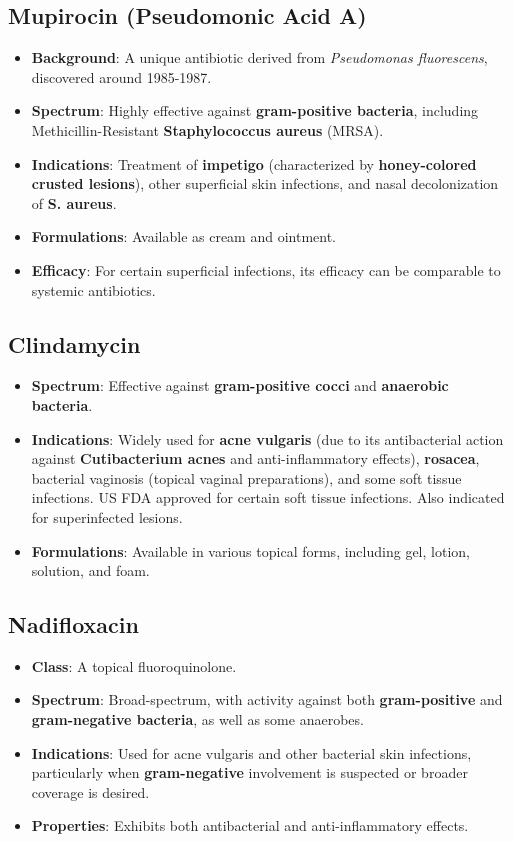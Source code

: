 \documentclass{article}
\begin{document}
\subsection*{\textbf{Mupirocin} (Pseudomonic Acid A)}
\begin{itemize}
    \item \textbf{Background}: A unique antibiotic derived from \textit{Pseudomonas fluorescens}, discovered around 1985-1987.
    \item \textbf{Spectrum}: Highly effective against \textbf{gram-positive bacteria}, including Methicillin-Resistant \textbf{Staphylococcus aureus} (MRSA).
    \item \textbf{Indications}: Treatment of \textbf{impetigo} (characterized by \textbf{honey-colored crusted lesions}), other superficial skin infections, and nasal decolonization of \textbf{S. aureus}.
    \item \textbf{Formulations}: Available as cream and ointment.
    \item \textbf{Efficacy}: For certain superficial infections, its efficacy can be comparable to systemic antibiotics.
\end{itemize}

\subsection*{\textbf{Clindamycin}}
\begin{itemize}
    \item \textbf{Spectrum}: Effective against \textbf{gram-positive cocci} and \textbf{anaerobic bacteria}.
    \item \textbf{Indications}: Widely used for \textbf{acne vulgaris} (due to its antibacterial action against \textbf{Cutibacterium acnes} and anti-inflammatory effects), \textbf{rosacea}, bacterial vaginosis (topical vaginal preparations), and some soft tissue infections. US FDA approved for certain soft tissue infections. Also indicated for superinfected lesions.
    \item \textbf{Formulations}: Available in various topical forms, including gel, lotion, solution, and foam.
\end{itemize}

\subsection*{\textbf{Nadifloxacin}}
\begin{itemize}
    \item \textbf{Class}: A topical fluoroquinolone.
    \item \textbf{Spectrum}: Broad-spectrum, with activity against both \textbf{gram-positive} and \textbf{gram-negative bacteria}, as well as some anaerobes.
    \item \textbf{Indications}: Used for acne vulgaris and other bacterial skin infections, particularly when \textbf{gram-negative} involvement is suspected or broader coverage is desired.
    \item \textbf{Properties}: Exhibits both antibacterial and anti-inflammatory effects.
\end{itemize}
\end{document}
